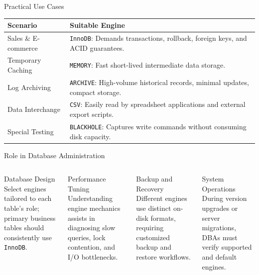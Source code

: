 \documentclass[aspectratio=169,11pt]{beamer}
\newcommand{\code}[1]{\texttt{#1}}
\begin{document}
\begin{frame}{Practical Use Cases}
\begin{center}
\begin{tabularx}{0.96\textwidth}{p{} X}
\toprule
\textbf{Scenario} & \textbf{Suitable Engine} \\
\midrule
Sales \& E-commerce & \code{InnoDB}: Demands transactions, rollback, foreign keys, and ACID guarantees. \\
Temporary Caching & \code{MEMORY}: Fast short-lived intermediate data storage. \\
Log Archiving & \code{ARCHIVE}: High-volume historical records, minimal updates, compact storage. \\
Data Interchange & \code{CSV}: Easily read by spreadsheet applications and external export scripts. \\
Special Testing & \code{BLACKHOLE}: Captures write commands without consuming disk capacity. \\
\bottomrule
\end{tabularx}
\end{center}
\end{frame}

\begin{frame}{Role in Database Administration}
\begin{columns}[T,onlytextwidth]
\begin{block}{Database Design}
Select engines tailored to each table's role; primary business tables should consistently use \code{InnoDB}.
\end{block}
\begin{block}{Performance Tuning}
Understanding engine mechanics assists in diagnosing slow queries, lock contention, and I/O bottlenecks.
\end{block}
\begin{block}{Backup and Recovery}
Different engines use distinct on-disk formats, requiring customized backup and restore workflows.
\end{block}
\begin{block}{System Operations}
During version upgrades or server migrations, DBAs must verify supported and default engines.
\end{block}
\end{columns}
\end{frame}
\end{document}
